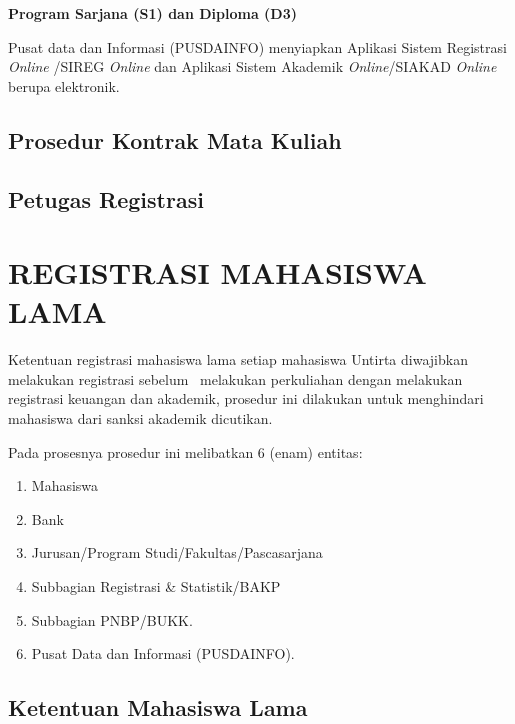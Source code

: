 \documentclass[
]{book}
\providecommand{\tightlist}{%
  \setlength{\itemsep}{0pt}\setlength{\parskip}{0pt}}
\begin{document}
\textbf{Program Sarjana (S1) dan Diploma (D3)}

Pusat data dan Informasi (PUSDAINFO) menyiapkan Aplikasi Sistem Registrasi \emph{Online} /SIREG \emph{Online} dan Aplikasi Sistem Akademik \emph{Online}/SIAKAD \emph{Online} berupa elektronik.

\hypertarget{prosedur-kontrak-mata-kuliah}{%
\section{Prosedur Kontrak Mata Kuliah}\label{prosedur-kontrak-mata-kuliah}}

\hypertarget{petugas-registrasi}{%
\section{Petugas Registrasi}\label{petugas-registrasi}}

\hypertarget{registrasi-mahasiswa-lama}{%
\chapter{REGISTRASI MAHASISWA LAMA}\label{registrasi-mahasiswa-lama}}

Ketentuan registrasi mahasiswa lama setiap mahasiswa Untirta diwajibkan melakukan registrasi sebelum~ melakukan perkuliahan dengan melakukan registrasi keuangan dan akademik, prosedur ini dilakukan untuk menghindari mahasiswa dari sanksi akademik dicutikan.

Pada prosesnya prosedur ini melibatkan 6 (enam) entitas:

\begin{enumerate}
\def\labelenumi{\arabic{enumi}.}
\tightlist
\item
  Mahasiswa
\item
  Bank
\item
  Jurusan/Program Studi/Fakultas/Pascasarjana
\item
  Subbagian Registrasi \& Statistik/BAKP
\item
  Subbagian PNBP/BUKK.
\item
  Pusat Data dan Informasi (PUSDAINFO).
\end{enumerate}

\hypertarget{ketentuan-mahasiswa-lama}{%
\section{Ketentuan Mahasiswa Lama}\label{ketentuan-mahasiswa-lama}}
\end{document}
